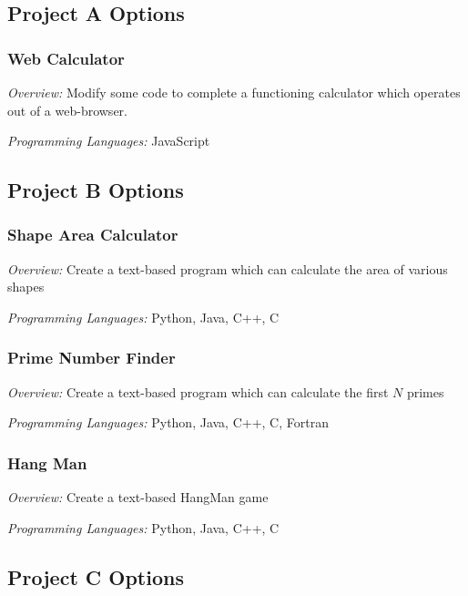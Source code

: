     \subsection{Project A Options}
    \label{ssec:project_a_opts}

      \subsubsection{Web Calculator}
      \label{sssec:web_calc}

        \textit{Overview:} Modify some code to complete a functioning calculator which operates out of a web-browser.

        \textit{Programming Languages:} JavaScript

    \subsection{Project B Options}
    \label{ssec:project_b_opts}

      \subsubsection{Shape Area Calculator}
      \label{sssec:shape_area_calc}

        \textit{Overview:} Create a text-based program which can calculate the area of various shapes

        \textit{Programming Languages:} Python, Java, C++, C

      \subsubsection{Prime Number Finder}
      \label{sssec:prime_number_finder}

        \textit{Overview:} Create a text-based program which can calculate the first $N$ primes

        \textit{Programming Languages:} Python, Java, C++, C, Fortran

      \subsubsection{Hang Man}
      \label{sssec:hang_man}

        \textit{Overview:} Create a text-based HangMan game

        \textit{Programming Languages:} Python, Java, C++, C

    \subsection{Project C Options}
    \label{ssec:project_c_opts}

